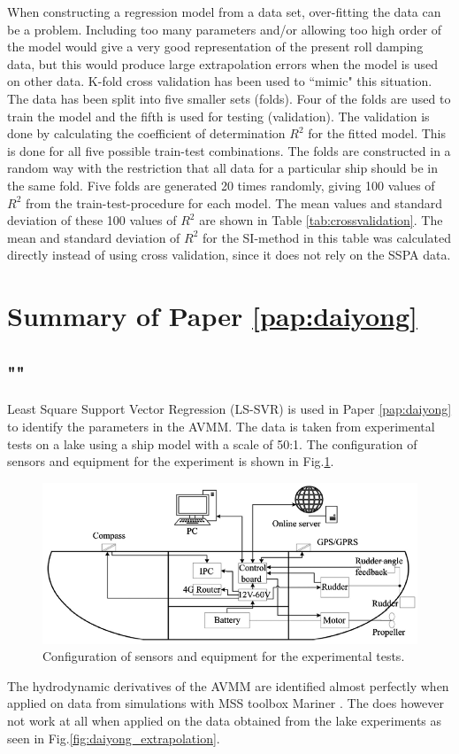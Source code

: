 \noindent When constructing a regression model from a data set, over-fitting the data can be a problem. Including too many parameters and/or allowing too high order of the model would give a very good representation of the present roll damping data, but this would produce large extrapolation errors when the model is used on other data. K-fold cross validation has been used to ``mimic" this situation. The data has been split into five smaller sets (folds). Four of the folds are used to train the model and the fifth is used for testing (validation). The validation is done by calculating the coefficient of determination $R^2$ for the fitted model. This is done for all five possible train-test combinations. 
The folds are constructed in a random way with the restriction that all data for a particular ship should be in the same fold. Five folds are generated 20 times randomly, giving 100 values of $R^2$ from the train-test-procedure for each model. The mean values and standard deviation of these 100 values of $R^2$ are shown in Table \ref{tab:crossvalidation}. The mean and standard deviation of $R^2$ for the SI-method in this table was calculated directly instead of using cross validation, since it does not rely on the SSPA data.




\section{Summary of Paper \ref{pap:daiyong}}
\subsection*{""}
Least Square Support Vector Regression (LS-SVR) \cite{brereton_support_2010} is used in Paper \ref{pap:daiyong} to identify the parameters in the AVMM.  
The data is taken from experimental tests on a lake using a ship model with a scale of 50:1. The configuration of sensors and equipment for the experiment is shown in Fig.\ref{fig:cthmodel}.  
\begin{figure}[H]
    \centering
    \includegraphics[width=\textwidth]{kappa/images/cth_model.png}
    \caption{Configuration of sensors and equipment for the experimental tests.}
    \label{fig:cthmodel}
\end{figure}
\noindent The hydrodynamic derivatives of the AVMM are identified almost perfectly when applied on data from simulations with MSS toolbox Mariner \cite{tristan_matlab_2009}. The  does however not work at all when applied on the data obtained from the lake experiments as seen in Fig.\ref{fig:daiyong_extrapolation}. 

